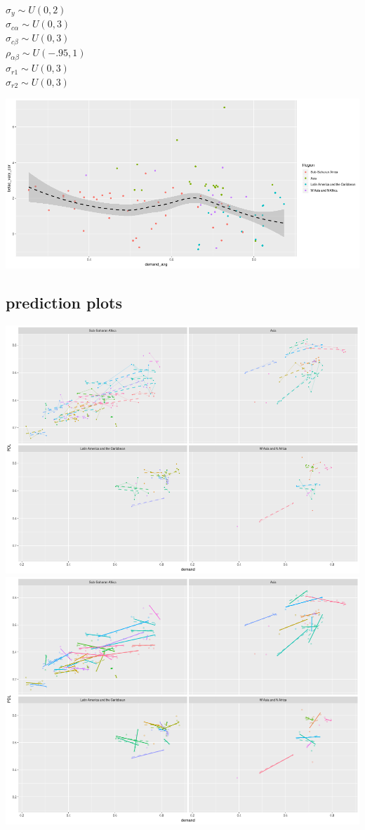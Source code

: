 \documentclass[12pt]{article}
\begin{document}
\noindent
 $ \sigma_y \sim U(0,2) $ \\
 $\sigma_{c\alpha} \sim U(0,3) $ \\
 $\sigma_{c\beta} \sim U(0,3) $\\
 $\rho_{\alpha\beta} \sim U(-.95,1)$ \\
 $ \sigma_{r1} \sim U(0,3) $\\
 $ \sigma_{r2} \sim U(0,3) $\\
\begin{center}
\includegraphics[scale=0.4]{3.png}
\end{center}
\newpage
\subsection{prediction plots}
\begin{center}
\includegraphics[scale=.5]{a.png}
\includegraphics[scale=.5]{b.png}
\end{center}
\end{document}

